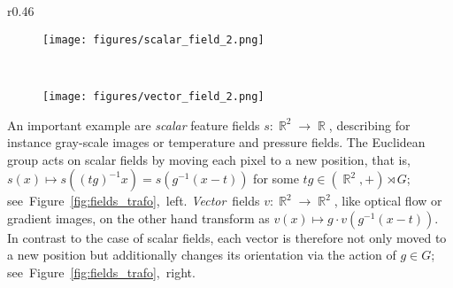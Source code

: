 \documentclass{article}
\DeclareMathOperator*{\R}{\mathbb{R}}
\begin{document}
\begin{wrapfigure}[12]{r}{0.46\textwidth}
    \begin{subfigure}{.47\linewidth}
        \texttt{[image: figures/scalar\_field\_2.png]}\end{subfigure}
    \hspace*{1ex}~
    \begin{subfigure}{.47\linewidth}
        \texttt{[image: figures/vector\_field\_2.png]}\end{subfigure}
    \vspace*{-.6ex}
    \caption{
        Transformation behavior of $\rho$-fields.
        }
    \label{fig:fields_trafo}
\end{wrapfigure}
An important example are \emph{scalar} feature fields ${s:\R^2\to\R}$, describing for instance gray-scale images or temperature and pressure fields.
The Euclidean group acts on scalar fields by moving each pixel to a new position, that is, $s(x)\mapsto s\left((tg)^{-1}x\right) = s\left(g^{-1}(x-t)\right)$ for some $tg\in(\R^2,+)\rtimes G$; \mbox{see Figure~\ref{fig:fields_trafo}, left.}
\mbox{\emph{Vector}~fields} ${v:\R^2\to\R^2}$, like optical flow or gradient images, on the other hand transform as ${v(x)\mapsto g\cdot v\left(g^{-1}(x-t)\right)}$.
In contrast to the case of scalar fields, each vector is therefore not only moved to a new position but additionally changes its orientation via the action of $g\in G$; \mbox{see Figure~\ref{fig:fields_trafo},~right.}
\end{document}
